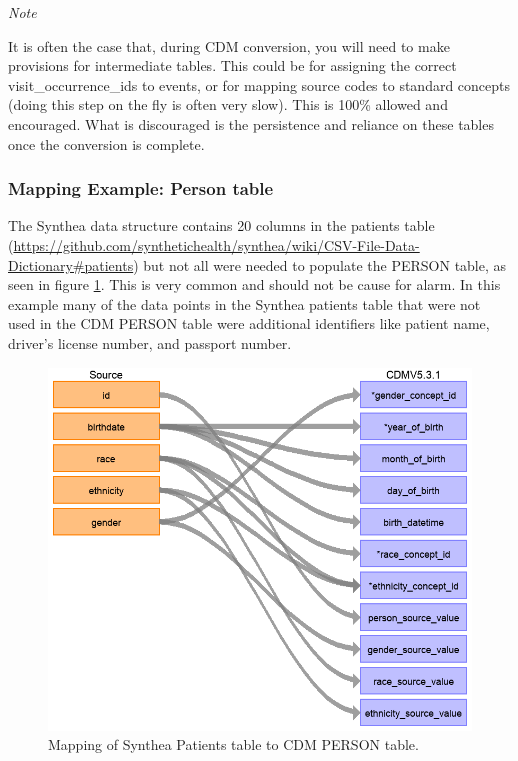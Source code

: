 \documentclass[11pt]{book}
\theoremstyle{definition}
\theoremstyle{definition}
\theoremstyle{definition}
\theoremstyle{remark}
\begin{document}
\emph{Note}

It is often the case that, during CDM conversion, you will need to make provisions for intermediate tables. This could be for assigning the correct visit\_occurrence\_ids to events, or for mapping source codes to standard concepts (doing this step on the fly is often very slow). This is 100\% allowed and encouraged. What is discouraged is the persistence and reliance on these tables once the conversion is complete.

\hypertarget{mapping-example-person-table}{%
\subsubsection{Mapping Example: Person table}\label{mapping-example-person-table}}

The Synthea data structure contains 20 columns in the patients table (\url{https://github.com/synthetichealth/synthea/wiki/CSV-File-Data-Dictionary\#patients}) but not all were needed to populate the PERSON table, as seen in figure \ref{fig:syntheaPerson}. This is very common and should not be cause for alarm. In this example many of the data points in the Synthea patients table that were not used in the CDM PERSON table were additional identifiers like patient name, driver's license number, and passport number.

\begin{figure}
\includegraphics[width=1\linewidth]{images/ExtractTransformLoad/syntheaPersonTable} \caption{Mapping of Synthea Patients table to CDM PERSON table.}\label{fig:syntheaPerson}
\end{figure}
\end{document}

